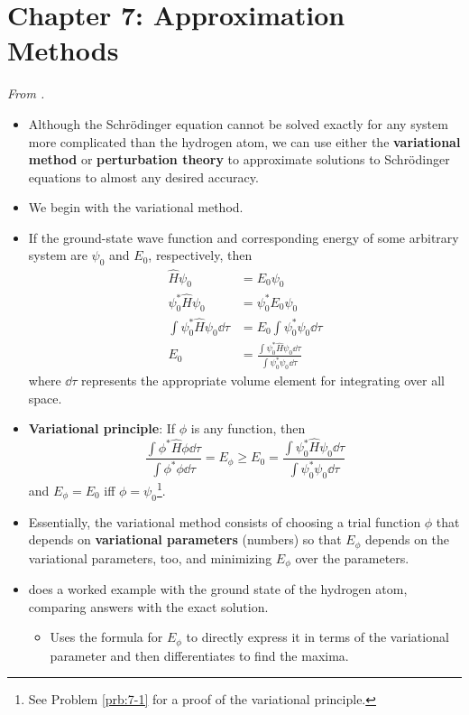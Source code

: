 \documentclass[../notes.tex]{subfiles}
\begin{document}
\section{Chapter 7: Approximation Methods}
\emph{From \textcite{bib:McQuarrieSimon}.}
\begin{itemize}
    \item {}Although the Schr\"{o}dinger equation cannot be solved exactly for any system more complicated than the hydrogen atom, we can use either the \textbf{variational method} or \textbf{perturbation theory} to approximate solutions to Schr\"{o}dinger equations to almost any desired accuracy.
    \item We begin with the variational method.
    \item If the ground-state wave function and corresponding energy of some arbitrary system are $\psi_0$ and $E_0$, respectively, then
    \begin{align*}
        \hat{H}\psi_0 &= E_0\psi_0\\
        \psi_0^*\hat{H}\psi_0 &= \psi_0^*E_0\psi_0\\
        \int\psi_0^*\hat{H}\psi_0\dd{\tau} &= E_0\int\psi_0^*\psi_0\dd{\tau}\\
        E_0 &= \frac{\int\psi_0^*\hat{H}\psi_0\dd{\tau}}{\int\psi_0^*\psi_0\dd{\tau}}
    \end{align*}
    where $\dd{\tau}$ represents the appropriate volume element for integrating over all space.
    \item \textbf{Variational principle}: If $\phi$ is any function, then
    \begin{equation*}
        \frac{\int\phi^*\hat{H}\phi\dd{\tau}}{\int\phi^*\phi\dd{\tau}} = E_\phi
        \geq E_0
        = \frac{\int\psi_0^*\hat{H}\psi_0\dd{\tau}}{\int\psi_0^*\psi_0\dd{\tau}}
    \end{equation*}
    and $E_\phi=E_0$ iff $\phi=\psi_0$\footnote{See Problem \ref{prb:7-1} for a proof of the variational principle.}.
    \item Essentially, the variational method consists of choosing a trial function $\phi$ that depends on \textbf{variational parameters} (numbers) so that $E_\phi$ depends on the variational parameters, too, and minimizing $E_\phi$ over the parameters.
    \item \textcite{bib:McQuarrieSimon} does a worked example with the ground state of the hydrogen atom, comparing answers with the exact solution.
    \begin{itemize}
        \item Uses the formula for $E_\phi$ to directly express it in terms of the variational parameter and then differentiates to find the maxima.

\end{itemize}
\end{itemize}
\end{document}
